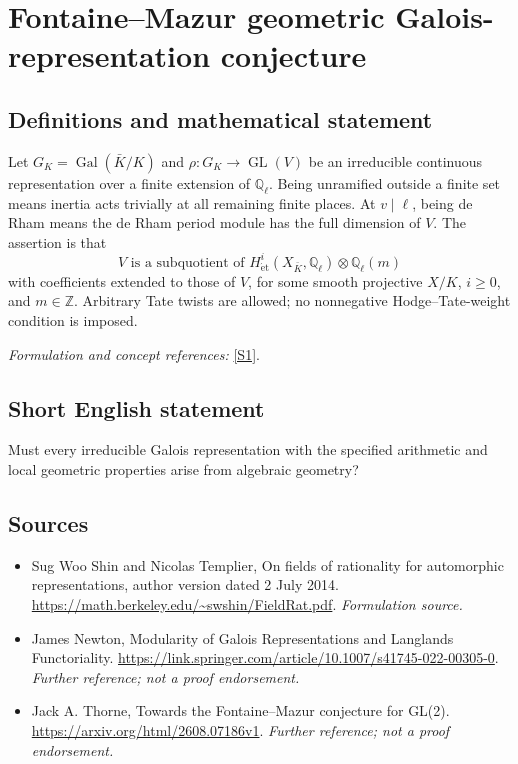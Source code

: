 \documentclass[11pt]{article}
\begin{document}
\section*{\texorpdfstring{Fontaine–Mazur geometric Galois-representation conjecture}{Fontaine–Mazur geometric Galois-representation conjecture}}\label{statement}
\subsection{Definitions and mathematical statement}
Let $G_K=\operatorname{Gal}(\bar K/K)$ and $\rho:G_K\to\operatorname{GL}(V)$ be an irreducible continuous representation over a finite extension of ${\mathbb{Q}}_\ell$. Being unramified outside a finite set means inertia acts trivially at all remaining finite places. At $v\mid\ell$, being de Rham means the de Rham period module has the full dimension of $V$. The assertion is that
\[
 V\text{ is a subquotient of }H^i_{\mathrm{\acute et}}(X_{\bar K},{\mathbb{Q}}_\ell)\otimes{\mathbb{Q}}_\ell(m)
\]
with coefficients extended to those of $V$, for some smooth projective $X/K$, $i\ge0$, and $m\in{\mathbb{Z}}$. Arbitrary Tate twists are allowed; no nonnegative Hodge--Tate-weight condition is imposed.
\par\smallskip\textit{Formulation and concept references:} \href{https://math.berkeley.edu/~swshin/FieldRat.pdf}{[S1]}.

\subsection{Short English statement}
Must every irreducible Galois representation with the specified arithmetic and local geometric properties arise from algebraic geometry?
\subsection{Sources}
\begin{itemize}
\item[S1]Sug Woo Shin and Nicolas Templier, On fields of rationality for automorphic representations, author version dated 2 July 2014.
\url{https://math.berkeley.edu/~swshin/FieldRat.pdf}.
\textit{Formulation source.}
\item[S2]James Newton, Modularity of Galois Representations and Langlands Functoriality.
\url{https://link.springer.com/article/10.1007/s41745-022-00305-0}.
\textit{Further reference; not a proof endorsement.}
\item[S3]Jack A. Thorne, Towards the Fontaine–Mazur conjecture for GL(2).
\url{https://arxiv.org/html/2608.07186v1}.
\textit{Further reference; not a proof endorsement.}
\end{itemize}
\end{document}
